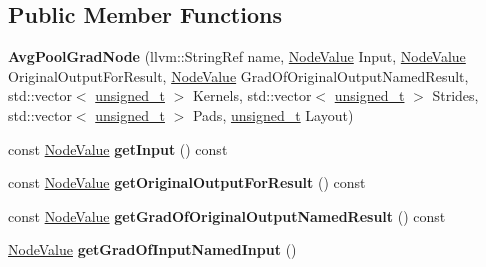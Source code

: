 \subsection*{Public Member Functions}
\begin{DoxyCompactItemize}
\item 
\mbox{\label{classglow_1_1_avg_pool_grad_node_af39fdda86318935e4edce9e1953256de}} 
{\bfseries Avg\+Pool\+Grad\+Node} (llvm\+::\+String\+Ref name, \hyperlink{structglow_1_1_node_value}{Node\+Value} Input, \hyperlink{structglow_1_1_node_value}{Node\+Value} Original\+Output\+For\+Result, \hyperlink{structglow_1_1_node_value}{Node\+Value} Grad\+Of\+Original\+Output\+Named\+Result, std\+::vector$<$ \hyperlink{namespaceglow_a0ca574644e1e42ef193a9947fb4d8911}{unsigned\+\_\+t} $>$ Kernels, std\+::vector$<$ \hyperlink{namespaceglow_a0ca574644e1e42ef193a9947fb4d8911}{unsigned\+\_\+t} $>$ Strides, std\+::vector$<$ \hyperlink{namespaceglow_a0ca574644e1e42ef193a9947fb4d8911}{unsigned\+\_\+t} $>$ Pads, \hyperlink{namespaceglow_a0ca574644e1e42ef193a9947fb4d8911}{unsigned\+\_\+t} Layout)
\item 
\mbox{\label{classglow_1_1_avg_pool_grad_node_ad7da1398638e7e0088933aa4fb181f22}} 
const \hyperlink{structglow_1_1_node_value}{Node\+Value} {\bfseries get\+Input} () const
\item 
\mbox{\label{classglow_1_1_avg_pool_grad_node_acfc0d636fce45996d00c4138300654e2}} 
const \hyperlink{structglow_1_1_node_value}{Node\+Value} {\bfseries get\+Original\+Output\+For\+Result} () const
\item 
\mbox{\label{classglow_1_1_avg_pool_grad_node_ad59d4f34c931906d72e6b6d70533f328}} 
const \hyperlink{structglow_1_1_node_value}{Node\+Value} {\bfseries get\+Grad\+Of\+Original\+Output\+Named\+Result} () const
\item 
\mbox{\label{classglow_1_1_avg_pool_grad_node_a5651981bb7939fd199a064bf0767d216}} 
\hyperlink{structglow_1_1_node_value}{Node\+Value} {\bfseries get\+Grad\+Of\+Input\+Named\+Input} ()
\item 
\mbox{\label{classglow_1_1_avg_pool_grad_node_abea807fa4ed95f76b71d505a38df98f7}} 

\end{DoxyCompactItemize}
